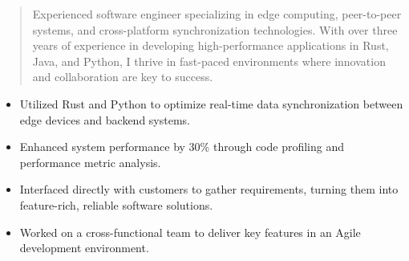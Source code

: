 



\makecvheader

\begin{quote}
  \noindent
  Experienced software engineer specializing in edge computing, peer-to-peer systems, and cross-platform synchronization technologies. With over three years of experience in developing high-performance applications in Rust, Java, and Python, I thrive in fast-paced environments where innovation and collaboration are key to success.
\end{quote}

\par\smallskip
\noindent
\begin{minipage}{20cm}
  \begin{minipage}{9.75cm}
    \begin{itemize}
      \item Utilized Rust and Python to optimize real-time data synchronization between edge devices and backend systems.
      \item Enhanced system performance by 30\% through code profiling and performance metric analysis.
    \end{itemize}
  \end{minipage}
  \hfill
  \begin{minipage}{9.75cm}
    \begin{itemize}
      \item Interfaced directly with customers to gather requirements, turning them into feature-rich, reliable software solutions.
      \item Worked on a cross-functional team to deliver key features in an Agile development environment.
    \end{itemize}
  \end{minipage}
\end{minipage}
\par\smallskip
\divider

